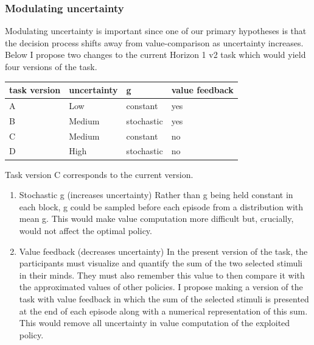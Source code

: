 \documentclass[11pt]{article}
\begin{document}
\subsubsection{Modulating uncertainty}
\label{sec:org2767359}
Modulating uncertainty is important since one of our primary hypotheses is that the decision process shifts away from value-comparison as uncertainty increases. Below I propose two changes to the current Horizon 1 v2 task which would yield four versions of the task.
\begin{table}[htbp]
\label{Table 3}
\centering
\begin{tabular}{llll}
task version & uncertainty & g & value feedback\\
\hline
A & Low & constant & yes\\
B & Medium & stochastic & yes\\
C & Medium & constant & no\\
D & High & stochastic & no\\
\end{tabular}
\end{table}
Task version C corresponds to the current version.
\begin{enumerate}
\item Stochastic g (increases uncertainty)
\label{sec:org814998a}
Rather than g being held constant in each block, g could be sampled before each episode from a distribution with mean g. This would make value computation more difficult but, crucially, would not affect the optimal policy.
\item Value feedback (decreases uncertainty)
\label{sec:orga882870}
In the present version of the task, the participants must visualize and quantify the sum of the two selected stimuli in their minds. They must also remember this value to then compare it with the approximated values of other policies. I propose making a version of the task with value feedback in which the sum of the selected stimuli is presented at the end of each episode along with a numerical representation of this sum. This would remove all uncertainty in value computation of the exploited policy.
\end{enumerate}
\end{document}

